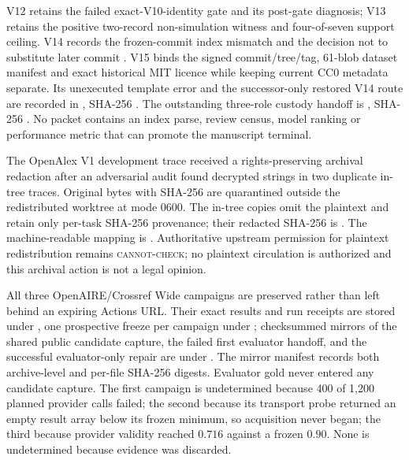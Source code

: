 V12 retains the failed exact-V10-identity gate and its post-gate diagnosis;
V13 retains the positive two-record non-simulation witness and four-of-seven
support ceiling.  V14 records the frozen-commit index mismatch and the decision
not to substitute later commit
.  V15 binds the signed
commit/tree/tag, 61-blob dataset manifest and exact historical MIT licence while
keeping current CC0 metadata separate.  Its unexecuted template error and the
successor-only restored V14 route are recorded in
, SHA-256
.
The outstanding three-role custody handoff is
, SHA-256
.
No packet contains an index parse, review census, model ranking or performance
metric that can promote the manuscript terminal.

The OpenAlex V1 development trace received a rights-preserving archival
redaction after an adversarial audit found decrypted  strings in
two duplicate in-tree traces. Original bytes with SHA-256
are quarantined outside the redistributed worktree at mode 0600. The in-tree
copies omit the plaintext and retain only per-task SHA-256 provenance; their
redacted SHA-256 is
.
The machine-readable mapping is
.
Authoritative upstream permission for plaintext redistribution remains
\textsc{cannot-check}; no plaintext circulation is authorized and this
archival action is not a legal opinion.

All three OpenAIRE/Crossref Wide campaigns are preserved rather than left behind
an expiring Actions URL.  Their exact results and run receipts are stored under
, one prospective freeze per campaign under
; checksummed mirrors of the shared public candidate capture,
the failed first evaluator handoff, and the successful evaluator-only repair are
under .  The mirror manifest records both
archive-level and per-file SHA-256 digests.  Evaluator gold never entered any
candidate capture.  The first campaign is undetermined because 400 of
1,200 planned provider calls failed; the second because its transport probe
returned an empty result array below its frozen minimum, so acquisition never
began; the third because provider validity reached $0.716$ against a frozen
$0.90$.  None is undetermined because evidence was discarded.

